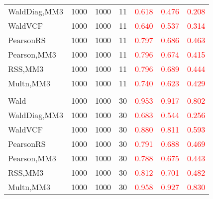 \documentclass[
]{article}
\begin{document}
\begin{table}[H]
{\begin{tabular}[t]{lrrrrrr}
\hspace{1em}WaldDiag,MM3 & 1000 & 1000 & 11 & \textcolor{red}{0.618} & \textcolor{red}{0.476} & \textcolor{red}{0.208}\\
\hspace{1em}WaldVCF & 1000 & 1000 & 11 & \textcolor{red}{0.640} & \textcolor{red}{0.537} & \textcolor{red}{0.314}\\
\hspace{1em}PearsonRS & 1000 & 1000 & 11 & \textcolor{red}{0.797} & \textcolor{red}{0.686} & \textcolor{red}{0.463}\\
\hspace{1em}Pearson,MM3 & 1000 & 1000 & 11 & \textcolor{red}{0.796} & \textcolor{red}{0.674} & \textcolor{red}{0.415}\\
\hspace{1em}RSS,MM3 & 1000 & 1000 & 11 & \textcolor{red}{0.796} & \textcolor{red}{0.689} & \textcolor{red}{0.444}\\
\hspace{1em}Multn,MM3 & 1000 & 1000 & 11 & \textcolor{red}{0.740} & \textcolor{red}{0.623} & \textcolor{red}{0.429}\\
\addlinespace[0.3em]
\multicolumn{7}{l}{\textbf{3F 15V}}\\
\hspace{1em}Wald & 1000 & 1000 & 30 & \textcolor{red}{0.953} & \textcolor{red}{0.917} & \textcolor{red}{0.802}\\
\hspace{1em}WaldDiag,MM3 & 1000 & 1000 & 30 & \textcolor{red}{0.683} & \textcolor{red}{0.544} & \textcolor{red}{0.256}\\
\hspace{1em}WaldVCF & 1000 & 1000 & 30 & \textcolor{red}{0.880} & \textcolor{red}{0.811} & \textcolor{red}{0.593}\\
\hspace{1em}PearsonRS & 1000 & 1000 & 30 & \textcolor{red}{0.791} & \textcolor{red}{0.688} & \textcolor{red}{0.469}\\
\hspace{1em}Pearson,MM3 & 1000 & 1000 & 30 & \textcolor{red}{0.788} & \textcolor{red}{0.675} & \textcolor{red}{0.443}\\
\hspace{1em}RSS,MM3 & 1000 & 1000 & 30 & \textcolor{red}{0.812} & \textcolor{red}{0.701} & \textcolor{red}{0.482}\\
\hspace{1em}Multn,MM3 & 1000 & 1000 & 30 & \textcolor{red}{0.958} & \textcolor{red}{0.927} & \textcolor{red}{0.830}\\
\bottomrule
\end{tabular}}
\endgroup{}
\end{table}
\end{document}
